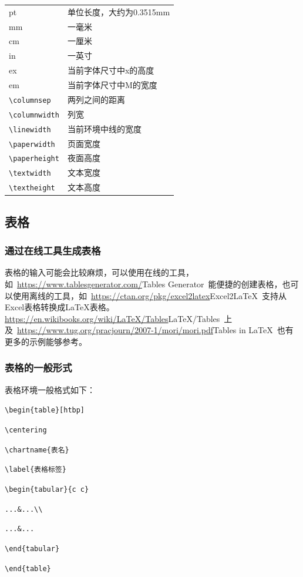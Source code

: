 \begin{tabular}{ll}
pt & 单位长度，大约为0.3515mm \\
mm & 一毫米 \\
cm & 一厘米 \\
in & 一英寸 \\
ex & 当前字体尺寸中x的高度 \\
em & 当前字体尺寸中M的宽度 \\
\verb|\columnsep| & 两列之间的距离 \\
\verb|\columnwidth| & 列宽 \\
\verb|\linewidth| & 当前环境中线的宽度 \\
\verb|\paperwidth| & 页面宽度 \\
\verb|\paperheight| & 夜面高度 \\
\verb|\textwidth| & 文本宽度 \\
\verb|\textheight| & 文本高度 \\
\end{tabular}

\subsection{表格}

\subsubsection{通过在线工具生成表格}

表格的输入可能会比较麻烦，可以使用在线的工具，如~\href{https://www.tablesgenerator.com/}{https://www.tablesgenerator.com/}{Tables Generator}~能便捷的创建表格，也可以使用离线的工具，如~\href{https://ctan.org/pkg/excel2latex}{https://ctan.org/pkg/excel2latex}{Excel2LaTeX}~支持从Excel表格转换成\LaTeX{}表格。\href{https://en.wikibooks.org/wiki/LaTeX/Tables}{https://en.wikibooks.org/wiki/LaTeX/Tables}{LaTeX/Tables}~上及~\href{https://www.tug.org/pracjourn/2007-1/mori/mori.pdf}{https://www.tug.org/pracjourn/2007-1/mori/mori.pdf}{Tables in LaTeX}~也有更多的示例能够参考。

\subsubsection{表格的一般形式}

表格环境一般格式如下：

\verb|\begin{table}[htbp]|\par 
\verb|\centering|\par 
\verb|\chartname{表名}|\par 
\verb|\label{表格标签}|\par 
\verb|\begin{tabular}{c c}|\par 
\verb|...&...\\|\par 
\verb|...&...|\par 
\verb|\end{tabular}|\par 
\verb|\end{table}|\par 

